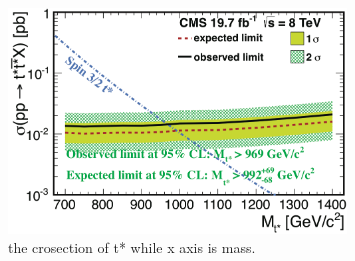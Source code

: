 \documentclass[12pt,oneandhalf,chaparabic,phys,ms,eng]{metu}
\begin{document}
\begin{figure}[!hbt]
\centering
    \includegraphics[width=0.8\textwidth]{SignalCl}
    \caption{\label{SignalCl} the crosection of t* while x axis is mass.}
\end{figure}


%





%
\end{document}
